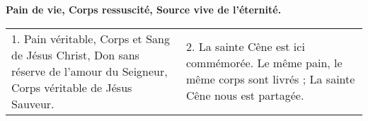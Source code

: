\textbf{Pain de vie, Corps ressuscité, Source vive de l’éternité.}

\begin{tabular}{p{} p{}}
1.
Pain véritable, Corps et Sang de Jésus Christ,\newline
Don sans réserve de l’amour du Seigneur,\newline
Corps véritable de Jésus Sauveur.
&
2.
La sainte Cêne est ici commémorée.\newline
Le même pain, le même corps sont livrés ;\newline
La sainte Cêne nous est partagée.
\end{tabular}

%
